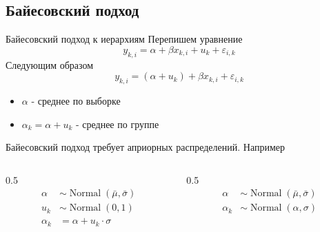 \documentclass{beamer}
\begin{document}
\subsection{Байесовский подход}
\begin{frame}{Байесовский подход к иерархиям}
Перепишем уравнение
\begin{equation*}
    y_{k,i} = \alpha + \beta x_{k,i} + u_{k} + \varepsilon_{i,k}
\end{equation*}
Следующим образом
\begin{equation*}
    y_{k,i} = (\alpha + u_{k}) + \beta x_{k,i} + \varepsilon_{i,k}
\end{equation*}
\begin{itemize}
    \item $\alpha$ - среднее по выборке
    \item $\alpha_k = \alpha + u_k$ - среднее по группе
\end{itemize}
 Байесовский подход требует априорных распределений. Например
\begin{columns}
\begin{column}{0.5\linewidth}
\begin{align*}
    \alpha &\sim \operatorname{Normal}(\bar\mu, \bar\sigma)\\
    u_k &\sim \operatorname{Normal}(0, 1)\\
    \alpha_k & = \alpha + u_k \cdot \sigma
\end{align*}
\end{column}
\begin{column}{0.5\linewidth}
\begin{align*}
    \alpha &\sim \operatorname{Normal}(\bar\mu, \bar\sigma)\\
    \alpha_k &\sim \operatorname{Normal}(\alpha, \sigma)
\end{align*}
\end{column}
\end{columns}
\end{frame}
\end{document}
